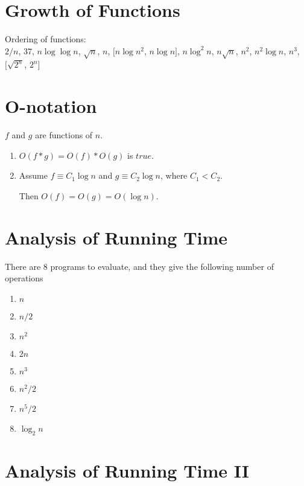 \documentclass[12pt]{article}
\title{}
\begin{document}
\section{Growth of Functions}
\label{sec:1}
Ordering of functions:\\
$2/n$, $37$, $n\log \log n$,
$\sqrt{n}$, $n$, $[n\log n^2$, $n\log n]$, $n\log^2 n$, $n\sqrt{n}$, $n^2$, 
$n^2\log n$, $n^3$, $[\sqrt{2^n}$, $2^n]$


\section{O-notation}
\label{sec:2}
$f$ and $g$ are functions of $n$.

\begin{enumerate}
	\item $O(f*g) = O(f)*O(g)$ is $true$.
	\item Assume $f \equiv C_1\log n$ and $g \equiv C_2\log n$, where $C_1 < C_2$.
	
	Then $O(f) = O(g) = O(\log n)$.
\end{enumerate}

\section{Analysis of Running Time}
\label{sec:3}
There are 8 programs to evaluate, and they give the following number of operations
\begin{enumerate}
	\item $n$
	\item $n/2$
	\item $n^2$
	\item $2n$
	\item $n^3$
	\item $n^2/2$
	\item $n^5/2$
	\item $\log_2 n$
\end{enumerate}
\section{Analysis of Running Time II}
\label{sec:4}

\end{document}
